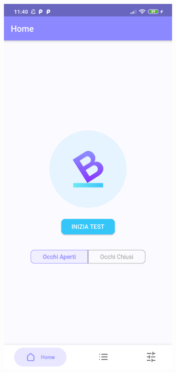 \begin{figure}[!htb]
\begin{subfigure}{.35\textwidth}
        \includegraphics[width=\textwidth]{figures/screenshot/redmi_note_8t/home.png}

\end{subfigure}
\end{figure}
